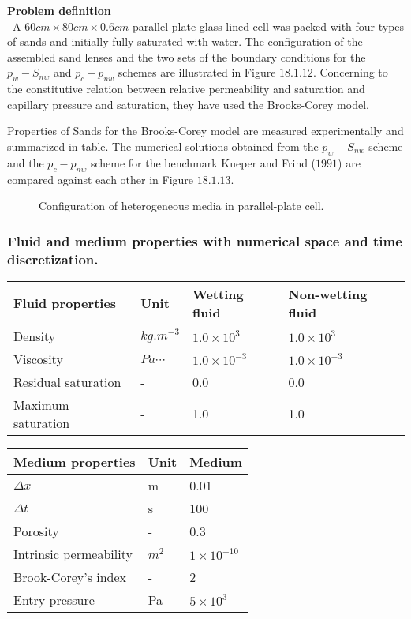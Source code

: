 \textbf{Problem definition}\\\
A $60cm\times80cm\times0.6cm$ parallel-plate glass-lined cell was packed with four types of sands and initially fully saturated with water. The configuration of the assembled sand lenses and the two sets of the boundary conditions for the $p_w-S_{nw}$ and $p_c-p_{nw}$ schemes are illustrated in Figure $18.1.12$. Concerning to the constitutive relation between relative permeability and saturation and capillary pressure and saturation, they have used the Brooks-Corey model. 


Properties of Sands for the Brooks-Corey model are measured experimentally and summarized in table. The numerical solutions obtained from the $p_w-S_{nw}$ scheme and the $p_c-p_{nw}$ scheme for the benchmark Kueper and Frind ($1991$) are compared against each other in Figure $18.1.13$. 
\begin{figure}[H]
\begin{center}
\end{center}
\caption{Configuration of heterogeneous media in parallel-plate cell.}
\label{mcwt:psModel}
\end{figure}

\subsubsection*{\upshape\textbf{Fluid and medium properties with numerical space and time discretization.}}
\begin{tabular}{|l|l|l|l|}
\hline
Fluid properties & Unit & Wetting fluid	& Non-wetting fluid \\
\hline
Density &	$kg.m^{-3}$ &	$1.0\times10^3$ &	$1.0\times10^3$ \\ 
\hline
Viscosity &	$Pa\cdots$ & $1.0\times10^{-3}$ &	$1.0\times10^{-3}$ \\
\hline
Residual saturation &	- &	0.0 &	0.0 \\
\hline
Maximum saturation &	- &	1.0 &	1.0 \\
\hline
\end{tabular}

\begin{tabular}{|l|l|l|}
\hline
Medium properties & Unit & Medium\\
\hline
$\Delta x$ & m &	0.01 \\
\hline
$\Delta t$ & s &	100 \\
\hline
Porosity & - &	0.3 \\
\hline
Intrinsic permeability & $m^2$ & $1\times10^{-10}$ \\
\hline
Brook-Corey's index &	- &	2 \\
\hline
Entry pressure & Pa & $5\times10^3$ \\
\hline
\end{tabular}

